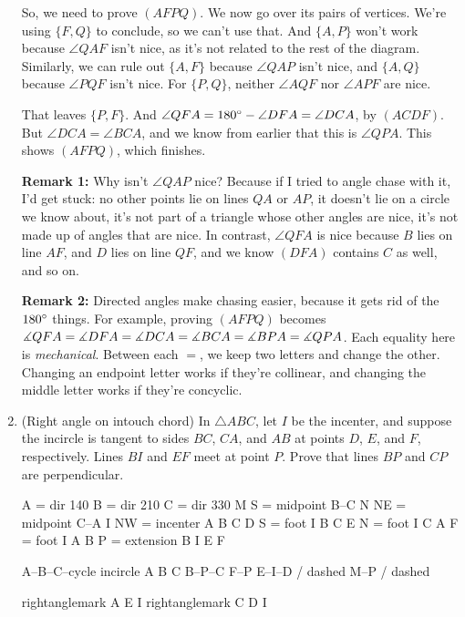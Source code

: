 \documentclass[11pt,paper=letter]{scrartcl}
\begin{document}
\begin{enumerate}
So, we need to prove $(AFPQ)$. We now go over its pairs of vertices. We're using $\{F, Q\}$ to conclude, so we can't use that. And $\{A, P\}$ won't work because $\angle QAF$ isn't nice, as it's not related to the rest of the diagram. Similarly, we can rule out $\{A, F\}$ because $\angle QAP$ isn't nice, and $\{A, Q\}$ because $\angle PQF$ isn't nice. For $\{P, Q\}$, neither $\angle AQF$ nor $\angle APF$ are nice.

That leaves $\{P, F\}$. And $\angle QFA = 180\dg - \angle DFA = \angle DCA$, by $(ACDF)$. But $\angle DCA = \angle BCA$, and we know from earlier that this is $\angle QPA$. This shows $(AFPQ)$, which finishes.

\textbf{Remark 1:} Why isn't $\angle QAP$ nice? Because if I tried to angle chase with it, I'd get stuck: no other points lie on lines $QA$ or $AP$, it doesn't lie on a circle we know about, it's not part of a triangle whose other angles are nice, it's not made up of angles that are nice. In contrast, $\angle QFA$ is nice because $B$ lies on line $AF$, and $D$ lies on line $QF$, and we know $(DFA)$ contains $C$ as well, and so on.

\textbf{Remark 2:} Directed angles make chasing easier, because it gets rid of the $180\dg$ things. For example, proving $(AFPQ)$ becomes $\dang QFA = \dang DFA = \dang DCA = \dang BCA = \dang BPA = \dang QPA$. Each equality here is \textit{mechanical}. Between each $=$, we keep two letters and change the other. Changing an endpoint letter works if they're collinear, and changing the middle letter works if they're concyclic.

\item (Right angle on intouch chord) In $\triangle ABC$, let $I$ be the incenter, and suppose the incircle is tangent to sides $BC$, $CA$, and $AB$ at points $D$, $E$, and $F$, respectively. Lines $BI$ and $EF$ meet at point $P$. Prove that lines $BP$ and $CP$ are perpendicular.

\begin{center}
\begin{tsqx}{7cm}
A = dir 140
B = dir 210
C = dir 330
M S = midpoint B--C
N NE = midpoint C--A
I NW = incenter A B C
D S = foot I B C
E N = foot I C A
F = foot I A B
P = extension B I E F

A--B--C--cycle
incircle A B C
B--P--C
F--P
E--I--D / dashed
M--P / dashed

rightanglemark A E I
rightanglemark C D I
\end{tsqx}
\end{center}


\end{enumerate}
\end{document}
